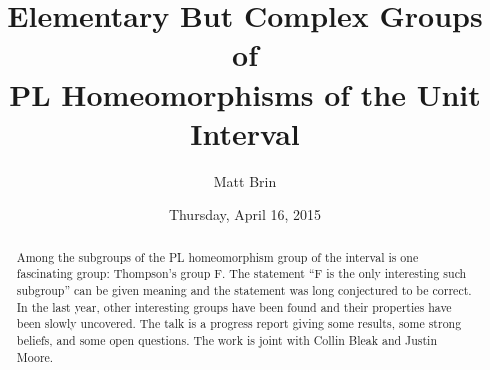 \documentclass{UAmathtalk}
\author{Matt Brin}
\title{Elementary But Complex Groups of\\PL Homeomorphisms of the Unit Interval
}
\date{Thursday, April 16, 2015}
\begin{document}
\maketitle

\begin{abstract}
Among the subgroups of the PL homeomorphism group of the interval is one
fascinating group: Thompson's group F.  The statement ``F is the only
interesting such subgroup'' can be given meaning and the statement was
long conjectured to be correct.  In the last year, other interesting
groups have been found and their properties have been slowly uncovered.
The talk is a progress report giving some results, some strong beliefs,
and some open questions. The work is joint with Collin Bleak and Justin
Moore. 
\end{abstract}
\end{document}
